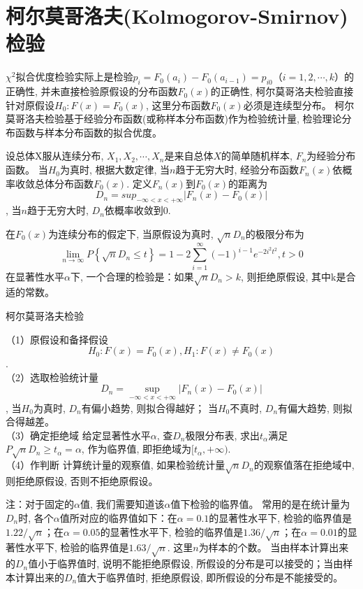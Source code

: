 \section{柯尔莫哥洛夫(Kolmogorov-Smirnov)检验}

$\chi^2$拟合优度检验实际上是检验$p_i=F_0(a_i)-F_0(a_{i-1})=p_{i0}（i=1,2,\cdots,k）$的正确性, 并未直接检验原假设的分布函数$F_0(x)$的正确性, 柯尔莫哥洛夫检验直接针对原假设$H_0:F(x)=F_0(x)$, 这里分布函数$F_0(x)$必须是连续型分布。 柯尔莫哥洛夫检验基于经验分布函数(或称样本分布函数)作为检验统计量, 检验理论分布函数与样本分布函数的拟合优度。 

设总体X服从连续分布, $X_1,X_2,\cdots,X_n$是来自总体$X$的简单随机样本, $F_n$为经验分布函数。 当$H_0$为真时, 根据大数定律, 当$n$趋于无穷大时, 经验分布函数$F_n(x)$依概率收敛总体分布函数$F_0(x)$. 定义$F_n(x)$到$F_0(x)$的距离为
$$D_n={sup}_{-\infty<x<+\infty}\left|F_n(x)-F_0(x)\right|$$, 
当$n$趋于无穷大时, $D_n$依概率收敛到$0$. 

\begin{theorem}[Kolmogorov定理]  
    在$F_0(x)$为连续分布的假定下, 当原假设为真时, $\sqrt n D_n$的极限分布为
$$ \lim _{n \rightarrow \infty} P\left\{\sqrt{n} D_{n} \leq t\right\}=1-2 \sum_{i=1}^{\infty}(-1)^{i-1} e^{-2 i^{2} t^{2}}, t>0 $$  
在显著性水平$\alpha$下, 一个合理的检验是：如果$\sqrt n D_n>k$, 则拒绝原假设, 其中k是合适的常数。    
\end{theorem}

\begin{algorithm}[]
    \caption{柯尔莫哥洛夫检验}
     （1）原假设和备择假设
$$  H_0:F(x)=F_0(x), H_1:F(x)\neq F_0(x)$$.\\
（2）选取检验统计量
$$D_n=\operatorname{sup}_{-\infty<x<+\infty} \left|F_n(x)-F_0(x)\right|$$, 
当$H_0$为真时, $D_n$有偏小趋势, 则拟合得越好；
当$H_0$不真时, $D_n$有偏大趋势, 则拟合得越差。 \\
（3）确定拒绝域
给定显著性水平$\alpha$, 查$D_n$极限分布表, 求出$t_\alpha$满足
$P{\sqrt n D_n\geq t_\alpha}=\alpha$, 
作为临界值, 即拒绝域为$[t_\alpha,+\infty)$. \\
（4）作判断
计算统计量的观察值, 如果检验统计量$\sqrt n D_n$的观察值落在拒绝域中, 则拒绝原假设, 否则不拒绝原假设。    
\end{algorithm}

注：对于固定的$\alpha$值, 我们需要知道该$\alpha$值下检验的临界值。 常用的是在统计量为$D_n$时, 各个$\alpha$值所对应的临界值如下：在$\alpha=0.1$的显著性水平下, 检验的临界值是$1.22/\sqrt n$；在$\alpha=0.05$的显著性水平下, 检验的临界值是$1.36/\sqrt n$；在$\alpha=0.01$的显著性水平下, 检验的临界值是$1.63/\sqrt n$. 这里$n$为样本的个数。 当由样本计算出来的$D_n$值小于临界值时, 说明不能拒绝原假设, 所假设的分布是可以接受的；当由样本计算出来的$D_n$值大于临界值时, 拒绝原假设, 即所假设的分布是不能接受的。 

